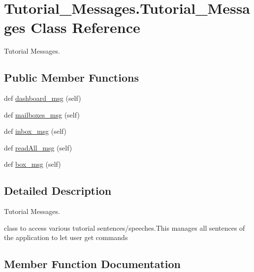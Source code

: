 \hypertarget{classTutorial__Messages_1_1Tutorial__Messages}{}\section{Tutorial\+\_\+\+Messages.\+Tutorial\+\_\+\+Messages Class Reference}
\label{classTutorial__Messages_1_1Tutorial__Messages}


Tutorial Messages.  


\subsection*{Public Member Functions}
\begin{DoxyCompactItemize}
\item 
def \hyperlink{classTutorial__Messages_1_1Tutorial__Messages_a86fd85203ffc5b44323efa615f4c9ac8}{dashboard\+\_\+msg} (self)
\item 
def \hyperlink{classTutorial__Messages_1_1Tutorial__Messages_a0d0b3b3ad8cf3487db7777b84d3308ad}{mailboxes\+\_\+msg} (self)
\item 
def \hyperlink{classTutorial__Messages_1_1Tutorial__Messages_aa3a0ce8f20ff445cbbb841a2276aa57b}{inbox\+\_\+msg} (self)
\item 
def \hyperlink{classTutorial__Messages_1_1Tutorial__Messages_ac48237f5f93e3447b709b020707a3911}{read\+All\+\_\+msg} (self)
\item 
def \hyperlink{classTutorial__Messages_1_1Tutorial__Messages_a2e05c1a82d118f6762b59415da14119b}{box\+\_\+msg} (self)
\end{DoxyCompactItemize}


\subsection{Detailed Description}
Tutorial Messages. 

class to access various tutorial sentences/speeches.\+This manages all sentences of the application to let user get commands 

\subsection{Member Function Documentation}
\mbox{\label{classTutorial__Messages_1_1Tutorial__Messages_a2e05c1a82d118f6762b59415da14119b}} 
